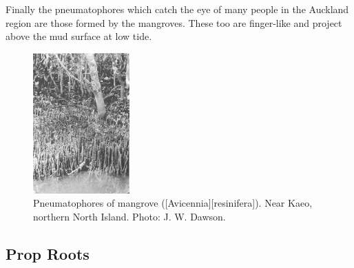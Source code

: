 Finally the pneumatophores which catch the eye of many people in the Auckland region are those formed by the mangroves.
These too are finger-like and project above the mud surface at low tide.

\begin{figure}
	\includegraphics[width=0.33\textwidth]{graphics/figure13mangrove.jpg}
	\centering
	\caption[Pneumatophores of mangrove]{Pneumatophores of mangrove ([Avicennia][resinifera]).
	Near Kaeo, northern North Island.
	Photo:  J. W. Dawson.}%
	\label{fig:13mangrove}
\end{figure}

\subsection{Prop Roots}

